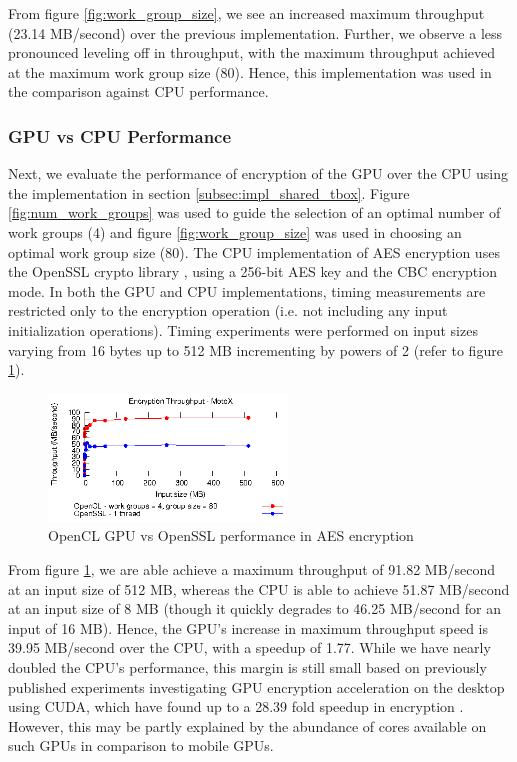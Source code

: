 \documentclass[conference,10pt]{IEEEtran}
\begin{document}
From figure \ref{fig:work_group_size}, we see an increased maximum throughput (23.14 MB/second) over the 
previous implementation.  Further, we observe a less pronounced leveling off in throughput, with the maximum 
throughput achieved at the maximum work group size (80). Hence, this implementation was used in the 
comparison against CPU performance.

\subsubsection{GPU vs CPU Performance}
\label{subsec:gpu_vs_cpu}

Next, we evaluate the performance of encryption of the GPU over the CPU using the implementation in section 
\ref{subsec:impl_shared_tbox}.   Figure \ref{fig:num_work_groups} was used to guide the selection of an optimal 
number of work groups (4) and figure \ref{fig:work_group_size} was used in choosing an optimal work group 
size (80).  The CPU implementation of AES encryption uses the OpenSSL crypto library \cite{openssl}, using 
a 256-bit AES key and the CBC encryption mode.  In both the GPU and CPU implementations, timing measurements 
are restricted only to the encryption operation (i.e. not including any input initialization operations).  
Timing experiments were performed on input sizes varying from 16 bytes up to 512 MB incrementing by powers 
of 2 (refer to figure \ref{fig:opencl_vs_cpu}).

\begin{figure}[!t]
\centering
\includegraphics[width=2.5in]{../final/motox/4.2/opencl_sizes_vs_cpu_sizes.shared_tbox_4G_80L.cpu_1thread.eps}
\caption{OpenCL GPU vs OpenSSL performance in AES encryption}
\label{fig:opencl_vs_cpu}
\end{figure}

From figure \ref{fig:opencl_vs_cpu}, we are able achieve a maximum throughput of 91.82 MB/second at an input size 
of 512 MB, whereas the CPU is able to achieve 51.87 MB/second at an input size of 8 MB (though it quickly 
degrades to 46.25 MB/second for an input of 16 MB).  Hence, the GPU's increase in maximum throughput speed 
is 39.95 MB/second over the CPU, with a speedup of 1.77.  While we have nearly doubled the CPU's 
performance, this margin is still small based on previously published experiments investigating GPU 
encryption acceleration on the desktop using CUDA, which have found up to a 28.39 fold speedup in 
encryption \cite{aes_cuda}.  However, this may be partly explained by the abundance of cores available on 
such GPUs in comparison to mobile GPUs.
\end{document}
